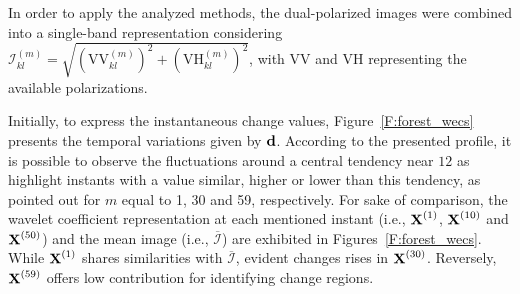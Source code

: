\documentclass[journal]{IEEEtran}
\newcommand{\vd}{{\textbf d}}
\newcommand{\vR}{{\textbf R}}
\newcommand{\vX}{{\textbf X}}
\begin{document}
In order to apply the analyzed methods, the dual-polarized images were combined into a single-band representation considering
$\mathcal{I}_{kl}^{(m)} = \sqrt{(\mathrm{VV}_{kl}^{(m)})^2+(\mathrm{VH}_{kl}^{(m)})^2}$, with $\mathrm{VV}$ and $\mathrm{VH}$ representing the available polarizations.




Initially, to express the instantaneous change values,
Figure~\ref{F:forest_wecs} presents the temporal variations given by $\vd$. According to the presented profile, it is possible to observe the fluctuations around a central tendency near $12$ as highlight instants with a value similar, higher or lower than this tendency, as pointed out for $m$ equal to 1, 30 and 59, respectively.
%
For sake of comparison, the wavelet coefficient representation at each mentioned instant (i.e., $\vX^{(1)}$, $\vX^{(10)}$ and $\vX^{(50)}$) and the mean image (i.e., $\overline{\mathcal{I}}$) are exhibited in Figures~\ref{F:forest_wecs}. While $\vX^{(1)}$ shares similarities with $\overline{\mathcal{I}}$, evident changes rises in $\vX^{(30)}$. Reversely, $\vX^{(59)}$ offers low contribution for identifying change regions.





\end{document}
